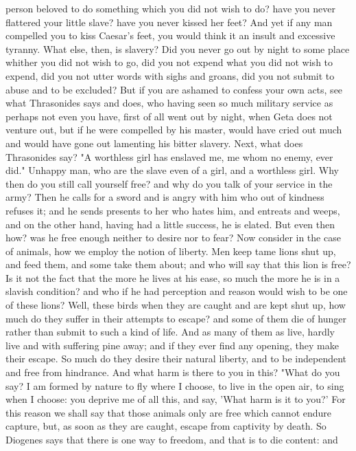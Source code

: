 \documentclass[a4paper]{article}
\begin{document}
person beloved to do something which you did not wish to do? have you never
flattered your little slave? have you never kissed her feet? And yet if any man
compelled you to kiss Caesar's feet, you would think it an insult and excessive
tyranny. What else, then, is slavery? Did you never go out by night to some
place whither you did not wish to go, did you not expend what you did not wish
to expend, did you not utter words with sighs and groans, did you not submit to
abuse and to be excluded? But if you are ashamed to confess your own acts, see
what Thrasonides says and does, who having seen so much military service as
perhaps not even you have, first of all went out by night, when Geta does not
venture out, but if he were compelled by his master, would have cried out much
and would have gone out lamenting his bitter slavery. Next, what does
Thrasonides say? "A worthless girl has enslaved me, me whom no enemy, ever
did." Unhappy man, who are the slave even of a girl, and a worthless girl. Why
then do you still call yourself free? and why do you talk of your service in
the army? Then he calls for a sword and is angry with him who out of kindness
refuses it; and he sends presents to her who hates him, and entreats and weeps,
and on the other hand, having had a little success, he is elated. But even then
how? was he free enough neither to desire nor to fear?
    Now consider in the case of animals, how we employ the notion of liberty.
Men keep tame lions shut up, and feed them, and some take them about; and who
will say that this lion is free? Is it not the fact that the more he lives at
his ease, so much the more he is in a slavish condition? and who if he had
perception and reason would wish to be one of these lions? Well, these birds
when they are caught and are kept shut up, how much do they suffer in their
attempts to escape? and some of them die of hunger rather than submit to such a
kind of life. And as many of them as live, hardly live and with suffering pine
away; and if they ever find any opening, they make their escape. So much do
they desire their natural liberty, and to be independent and free from
hindrance. And what harm is there to you in this? "What do you say? I am formed
by nature to fly where I choose, to live in the open air, to sing when I
choose: you deprive me of all this, and say, 'What harm is it to you?' For this
reason we shall say that those animals only are free which cannot endure
capture, but, as soon as they are caught, escape from captivity by death. So
Diogenes says that there is one way to freedom, and that is to die content: and
\end{document}
